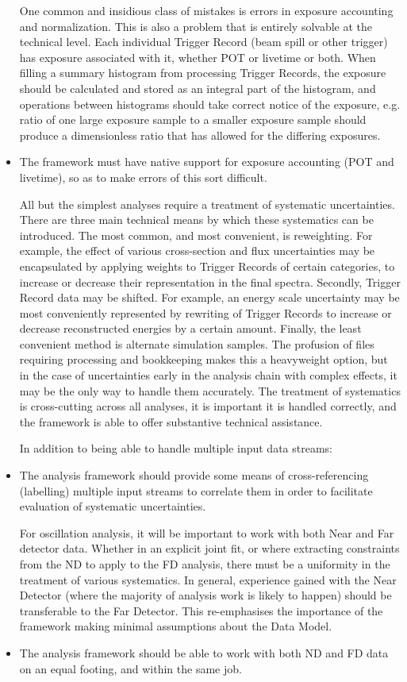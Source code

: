 \documentclass[../main-v1.tex]{subfiles}
\begin{document}
\begin{itemize}
One common and insidious class of mistakes is errors in exposure accounting and normalization. This is also a problem that is entirely solvable at the technical level.  Each individual Trigger Record (beam spill or other trigger) has exposure associated with it, whether POT or livetime or both. When filling a summary histogram from processing Trigger Records, the exposure should be calculated and stored as an integral part of the histogram, and operations between histograms should take correct notice of the exposure, e.g. ratio of one large exposure sample to a smaller exposure sample should produce a dimensionless ratio that has allowed for the differing exposures.

\item The framework must have native support for exposure accounting (POT and livetime), so as to make errors of this sort difficult.

All but the simplest analyses require a treatment of systematic uncertainties. There are three main technical means by which these systematics can be introduced. The most common, and most convenient, is reweighting. For example, the effect of various cross-section and flux uncertainties may be encapsulated by applying weights to Trigger Records of certain categories, to increase or decrease their representation in the final spectra. Secondly, Trigger Record data may be shifted. For example, an energy scale uncertainty may be most conveniently represented by rewriting of Trigger Records to increase or decrease reconstructed energies by a certain amount. Finally, the least convenient method is alternate simulation samples. The profusion of files requiring processing and bookkeeping makes this a heavyweight option, but in the case of uncertainties early in the analysis chain with complex effects, it may be the only way to handle them accurately. The treatment of systematics is cross-cutting across all analyses, it is important it is handled correctly, and the framework is able to offer substantive technical assistance.

In addition to being able to handle multiple input data streams:

\item The analysis framework should provide some means of cross-referencing (labelling) multiple input streams to correlate them in order to facilitate evaluation of systematic uncertainties.

For oscillation analysis, it will be important to work with both Near and Far detector data. Whether in an explicit joint fit, or where extracting constraints from the ND to apply to the FD analysis, there must be a uniformity in the treatment of various systematics. In general, experience gained with the Near Detector (where the majority of analysis work is likely to happen) should be transferable to the Far Detector.  This re-emphasises the importance of the framework making minimal assumptions about the Data Model.

\item The analysis framework should be able to work with both ND and FD data on an equal footing, and within the same job.


\end{itemize}
\end{document}

